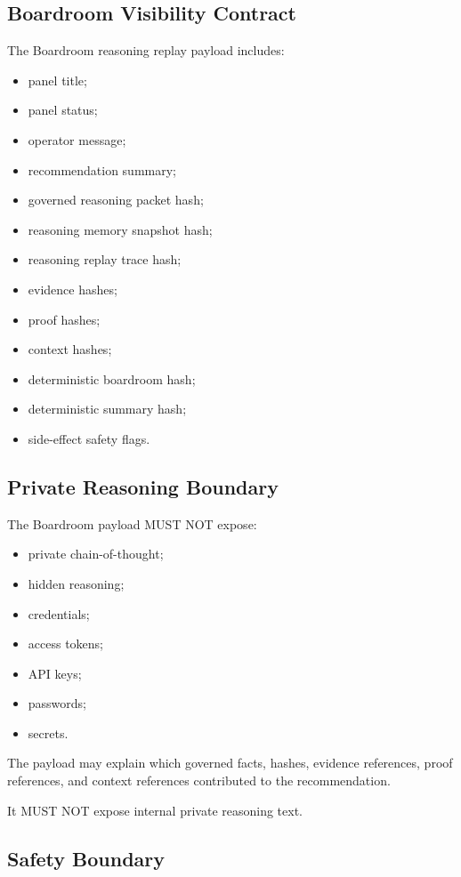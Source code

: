 \subsection{Boardroom Visibility Contract}

The Boardroom reasoning replay payload includes:

\begin{itemize}
  \item panel title;
  \item panel status;
  \item operator message;
  \item recommendation summary;
  \item governed reasoning packet hash;
  \item reasoning memory snapshot hash;
  \item reasoning replay trace hash;
  \item evidence hashes;
  \item proof hashes;
  \item context hashes;
  \item deterministic boardroom hash;
  \item deterministic summary hash;
  \item side-effect safety flags.
\end{itemize}

\subsection{Private Reasoning Boundary}

The Boardroom payload MUST NOT expose:

\begin{itemize}
  \item private chain-of-thought;
  \item hidden reasoning;
  \item credentials;
  \item access tokens;
  \item API keys;
  \item passwords;
  \item secrets.
\end{itemize}

The payload may explain which governed facts, hashes, evidence references, proof references, and context references contributed to the recommendation.

It MUST NOT expose internal private reasoning text.

\subsection{Safety Boundary}


